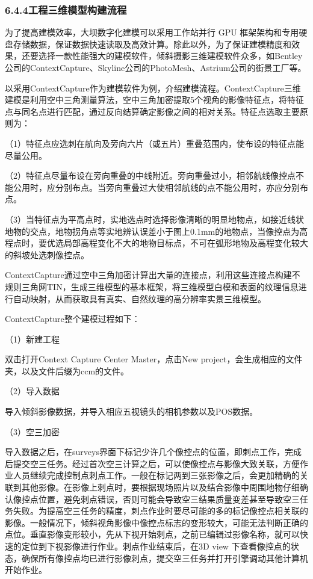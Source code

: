 \hypertarget{ux5de5ux7a0bux4e09ux7ef4ux6a21ux578bux6784ux5efaux6d41ux7a0b}{%
\subsubsection{6.4.4工程三维模型构建流程}\label{ux5de5ux7a0bux4e09ux7ef4ux6a21ux578bux6784ux5efaux6d41ux7a0b}}

为了提高建模效率，大坝数字化建模可以采用工作站并行 GPU 框架架构和专用硬盘存储数据，保证数据快速读取及高效计算。除此以外，为了保证建模精度和效果，还要选择一款性能强大的建模软件，倾斜摄影三维建模软件众多，如Bentley公司的ContextCapture、Skyline公司的PhotoMesh、Astrium公司的街景工厂等。

以采用ContextCapture作为建模软件为例，介绍建模流程。ContextCapture三维建模是利用空中三角测量算法，空中三角加密提取5个视角的影像特征点，将特征点与同名点进行匹配，通过反向结算确定影像之间的相对关系。特征点选取主要原则为：

（1）特征点应选刺在航向及旁向六片（或五片）重叠范围内，使布设的特征点能尽量公用。

（2）特征点尽量布设在旁向重叠的中线附近。旁向重叠过小，相邻航线像控点不能公用时，应分别布点。当旁向重叠过大使相邻航线的点不能公用时，亦应分别布点。

（3）当特征点为平高点时，实地选点时选择影像清晰的明显地物点，如接近线状地物的交点，地物拐角点等实地辨认误差小于图上0.1mm的地物点，当像控点为高程点时，要优选局部高程变化不大的地物目标点，不可在弧形地物及高程变化较大的斜坡处选刺像控点。

ContextCapture通过空中三角加密计算出大量的连接点，利用这些连接点构建不规则三角网TIN，生成三维模型的基本框架，将三维模型白模和表面的纹理信息进行自动映射，从而获取具有真实、自然纹理的高分辨率实景三维模型。

ContextCapture整个建模过程如下：

（1）新建工程

双击打开Context Capture Center Master，点击New project，会生成相应的文件夹，以及文件后缀为ccm的文件。

（2）导入数据

导入倾斜影像数据，并导入相应五视镜头的相机参数以及POS数据。

（3）空三加密

导入数据之后，在surveys界面下标记少许几个像控点的位置，即刺点工作，完成后提交空三任务。经过首次空三计算之后，可以使像控点与影像大致关联，方便作业人员继续完成控制点刺点工作。一般在标记两到三张影像之后，会更加精确的关联到其他影像。在影像上刺点时，要根据现场照片以及结合影像中周围地物仔细确认像控点位置，避免刺点错误，否则可能会导致空三结果质量变差甚至导致空三任务失败。为提高空三任务的精度，刺点作业时要尽可能的多的标记像控点相关联的影像。一般情况下，倾斜视角影像中像控点标志的变形较大，可能无法判断正确的点位。垂直影像变形较小，先从下视开始刺点，之前已编辑过影像名称，就可以快速的定位到下视影像进行作业。刺点作业结束后，在3D view 下查看像控点的状态，确保所有像控点均已进行影像刺点，提交空三任务并打开引擎调动其他计算机开始作业。

